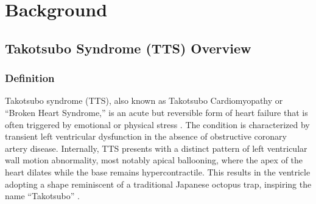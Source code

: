 \documentclass[12pt, BSc]{muthesis}
\begin{document}
\chapter{Background}
\label{ch:background}




\section{Takotsubo Syndrome (TTS) Overview}

\subsection{Definition}

Takotsubo syndrome (TTS), also known as Takotsubo Cardiomyopathy or “Broken Heart Syndrome,” is an acute but reversible form of heart failure that is often triggered by emotional or physical stress \cite{GUPTA2018165}. The condition is characterized by transient left ventricular dysfunction in the absence of obstructive coronary artery disease. Internally, TTS presents with a distinct pattern of left ventricular wall motion abnormality, most notably apical ballooning, where the apex of the heart dilates while the base remains hypercontractile. This results in the ventricle adopting a shape reminiscent of a traditional Japanese octopus trap, inspiring the name “Takotsubo” \cite{Akashi2015}.
\end{document}
